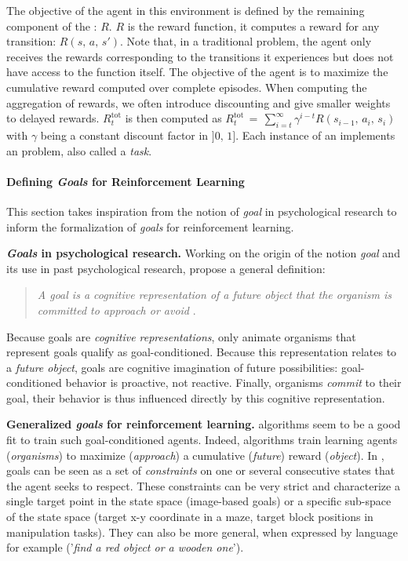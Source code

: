 The objective of the agent in this environment is defined by the remaining component of the \mdp: $R$. $R$ is the reward function, it computes a reward for any transition: $R(s,\,a,\,s')$. Note that, in a traditional \rl problem, the agent only receives the rewards corresponding to the transitions it experiences but does not have access to the function itself. The objective of the agent is to maximize the cumulative reward computed over complete episodes. When computing the aggregation of rewards, we often introduce discounting and give smaller weights to delayed rewards. $R^\text{tot}_t$ is then computed as $R^\text{tot}_t\,=\,\sum_{i=t}^\infty \gamma^{i-t}  R(s_{i-1},\,a_i,\,s_i)$ with $\gamma$ being a constant discount factor in $]0,\,1]$. Each instance of an \mdp implements an \rl problem, also called a \textit{task}.

\paragraph{Defining \textit{Goals} for Reinforcement Learning}
\label{sec:goals}
This section takes inspiration from the notion of \textit{goal} in psychological research to inform the formalization of \textit{goals} for reinforcement learning.

\textbf{\textit{Goals} in psychological research.} Working on the origin of the notion \textit{goal} and its use in past psychological research, \cite{elliot2008goal} propose a general definition:
\begin{quote}
    \textit{A goal is a cognitive representation of a future object that the organism is committed to approach or
    avoid} \cite{elliot2008goal}.
\end{quote}
Because goals are \textit{cognitive representations}, only animate organisms that represent goals qualify as goal-conditioned. Because this representation relates to a \textit{future object}, goals are cognitive imagination of future possibilities: goal-conditioned behavior is proactive, not reactive. Finally, organisms \textit{commit} to their goal, their behavior is thus influenced directly by this cognitive representation.

\textbf{Generalized \textit{goals} for reinforcement learning.} \rl algorithms seem to be a good fit to train such goal-conditioned agents. Indeed, \rl algorithms train learning agents (\textit{organisms}) to maximize (\textit{approach}) a cumulative (\textit{future}) reward (\textit{object}). In \rl, goals can be seen as a set of \textit{constraints} on one or several consecutive states that the agent seeks to respect. These constraints can be very strict and characterize a single target point in the state space (\eg image-based goals) or a specific sub-space of the state space (\eg target x-y coordinate in a maze, target block positions in manipulation tasks). They can also be more general, when expressed by language for example (\eg '\textit{find a red object or a wooden one}'). 


